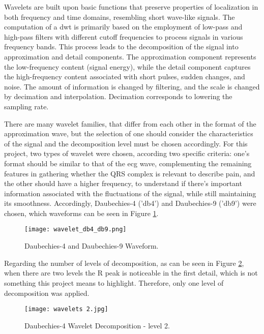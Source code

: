 Wavelets are built upon basic functions that preserve properties of localization in both frequency and time domains, resembling short wave-like signals. The computation of a \ac{dwt} is primarily based on the employment of low-pass and high-pass filters with different cutoff frequencies to process signals in various frequency bands. This process leads to the decomposition of the signal into approximation and detail components. The approximation component represents the low-frequency content (signal energy), while the detail component captures the high-frequency content associated with short pulses, sudden changes, and noise. The amount of information is changed by filtering, and the scale is changed by decimation and interpolation. Decimation corresponds to lowering the sampling rate. 

There are many wavelet families, that differ from each other in the format of the approximation wave, but the selection of one should consider the characteristics of the signal and the decomposition level must be chosen accordingly. For this project, two types of wavelet were chosen, according two specific criteria: one's format should be similar to that of the \ac{ecg} wave, complementing the remaining features in gathering whether the QRS complex is relevant to describe pain, and the other should have a higher frequency, to understand if there's important information associated with the fluctuations of the signal, while still maintaining its smoothness.
Accordingly, Daubechies-4 ('db4') and Daubechies-9 ('db9') were chosen, which waveforms can be seen in Figure \ref{fig:waveform}. 

\begin{figure}[h!]
    \centering
    \texttt{[image: wavelet\_db4\_db9.png]}
    \caption{Daubechies-4 and Daubechies-9 Waveform.}
    \label{fig:waveform}
\end{figure}



Regarding the number of levels of decomposition, as can be seen in Figure \ref{fig:wavelets2}, when there are two levels the R peak is noticeable in the first detail, which is not something this project means to highlight.
Therefore, only one level of decomposition was applied.

\begin{figure}[h!]
    \centering
    \texttt{[image: wavelets 2.jpg]}
    \caption{Daubechies-4 Wavelet Decomposition - level 2.}
    \label{fig:wavelets2}
\end{figure}


